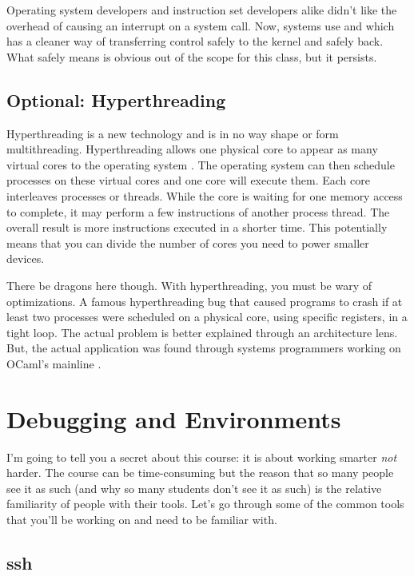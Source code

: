 Operating system developers and instruction set developers alike didn't like the overhead of causing an interrupt on a system call. Now, systems use  and  which has a cleaner way of transferring control safely to the kernel and safely back.
What safely means is obvious out of the scope for this class, but it persists.
\subsection{Optional: Hyperthreading}

Hyperthreading is a new technology and is in no way shape or form multithreading.
Hyperthreading allows one physical core to appear as many virtual cores to the operating system \cite[P.51]{guide2011intel}.
The operating system can then schedule processes on these virtual cores and one core will execute them.
Each core interleaves processes or threads.
While the core is waiting for one memory access to complete, it may perform a few instructions of another process thread.
The overall result is more instructions executed in a shorter time.
This potentially means that you can divide the number of cores you need to power smaller devices.

There be dragons here though.
With hyperthreading, you must be wary of optimizations.
A famous hyperthreading bug that caused programs to crash if at least two processes were scheduled on a physical core, using specific registers, in a tight loop.
The actual problem is better explained through an architecture lens.
But, the actual application was found through systems programmers working on OCaml's mainline \cite{leroy_2017}.

\section{Debugging and Environments}

I'm going to tell you a secret about this course: it is about working smarter \textit{not} harder.
The course can be time-consuming but the reason that so many people see it as such (and why so many students don't see it as such) is the relative familiarity of people with their tools.
Let's go through some of the common tools that you'll be working on and need to be familiar with.

\subsection{ssh}

